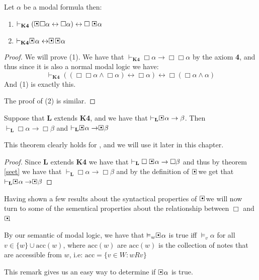 \documentclass[../main.tex]{subfiles}
\begin{document}
\begin{thm}
	\label{seet}
	Let $\alpha$ be a modal formula then:
	\begin{enumerate}
		\item $\vdash_{\textbf{K4}}(\sBox\Box\alpha\leftrightarrow\Box\alpha)\leftrightarrow
	\Box\sBox \alpha$
	\item $\vdash_{\textbf{K4}}\sBox\alpha\leftrightarrow\sBox\
		\sBox\alpha$
	\end{enumerate}
\end{thm}
\begin{proof}
	We will prove (1). We have that $\vdash_{\textbf{K4}}\Box\alpha\rightarrow\Box\Box\alpha$
	by the axiom \textbf{4}, and thus since it is also a normal modal logic
	we have:
	\[\vdash_{\textbf{K4}}((\Box\Box\alpha\wedge\Box\alpha)\leftrightarrow\Box\alpha)\leftrightarrow\Box(\Box\alpha\wedge\alpha)\]
	And (1) is exactly this. 

	The proof of (2) is similar.
\end{proof}
\begin{thm}
	\label{GLsæt}
	Suppose that \textbf{L} extends \textbf{K4}, and we have that
	$\vdash_{\textbf{L}}\sBox\alpha\rightarrow\beta$. Then
	$\vdash_{\textbf{L}}\Box\alpha\rightarrow\Box\beta$ and
	$\vdash_{\textbf{L}}\sBox\alpha\rightarrow\sBox\beta$
\end{thm}
This theorem clearly holds for \GL, and we will use it later in this chapter.
\begin{proof}
	Since \textbf{L} extends \textbf{K4} we have that
	$\vdash_{\textbf{L}}\Box\sBox\alpha\rightarrow\Box\beta$ and thus by
	theorem \ref{seet} we have that
	$\vdash_{\textbf{L}}\Box\alpha\rightarrow\Box\beta$ and by the
	definition of $\sBox$ we get that
	$\vdash_{\textbf{L}}\sBox\alpha\rightarrow\sBox\beta$
\end{proof}
Having shown a few results about the syntactical  properties of $\sBox$ we will now
turn to some of the sementical properties about the relationship between $\Box$
and $\sBox$.
\begin{remark}
	\label{rem:acc}
By our semantic of modal logic,  we have that $\vDash_w\sBox\alpha$ is true iff $\vDash_v\alpha$
for all $v\in\{w\}\cup\text{acc}(w)$, where $\text{acc}(w)$ are $\text{acc}(w)$
is the collection of notes that are accessible  from $w$, i.e:
$\text{acc}=\{v\in W:wRv\}$
\end{remark}

This remark gives us an easy way to determine if $\sBox \alpha$ is true.
\end{document}
